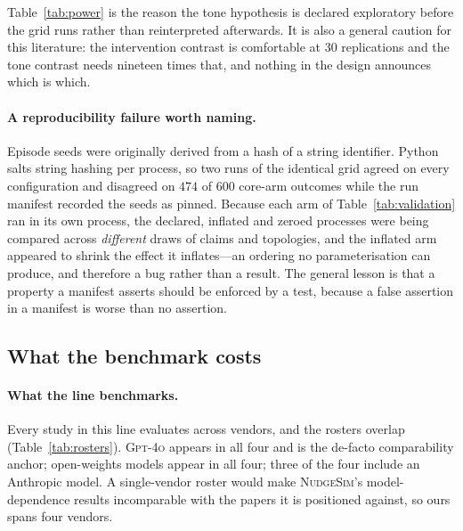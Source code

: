 \documentclass{article}
\begin{document}
Table~\ref{tab:power} is the reason the tone hypothesis is declared exploratory
before the grid runs rather than reinterpreted afterwards. It is also a general
caution for this literature: the intervention contrast is comfortable at 30
replications and the tone contrast needs nineteen times that, and nothing in the
design announces which is which.

\paragraph{A reproducibility failure worth naming.}
Episode seeds were originally derived from a hash of a string identifier.
Python salts string hashing per process, so two runs of the identical grid
agreed on every configuration and disagreed on $474$ of $600$ core-arm outcomes
while the run manifest recorded the seeds as pinned. Because each arm of
Table~\ref{tab:validation} ran in its own process, the declared, inflated and
zeroed processes were being compared across \emph{different} draws of claims and
topologies, and the inflated arm appeared to shrink the effect it inflates---an
ordering no parameterisation can produce, and therefore a bug rather than a
result. The general lesson is that a property a manifest asserts should be
enforced by a test, because a false assertion in a manifest is worse than no
assertion.

\subsection{What the benchmark costs}
\label{sec:cost}
\label{sec:models}

\begin{table}[t]
\centering

\caption{Metered from the prompts the environment assembles, priced against
published rates. Response caching---the lever such studies usually
name---returns nothing here, because every prompt carries a distinct claim,
agent and history.}
\label{tab:cost}
\end{table}

\paragraph{What the line benchmarks.}
Every study in this line evaluates across vendors, and the rosters overlap
(Table~\ref{tab:rosters}). \textsc{Gpt-4o} appears in all four and is the
de-facto comparability anchor; open-weights models appear in all four; three of
the four include an Anthropic model. A single-vendor roster would make
\textsc{NudgeSim}'s model-dependence results incomparable with the papers it is
positioned against, so ours spans four vendors.
\end{document}
